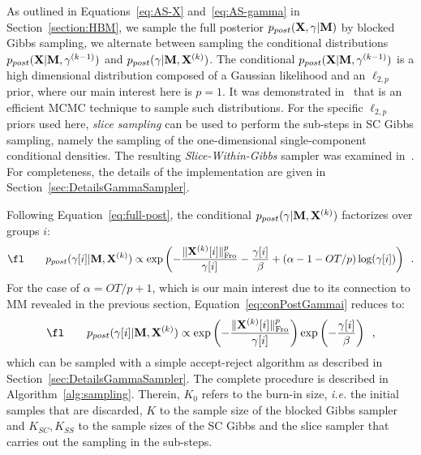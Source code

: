 As outlined in Equations~\eqref{eq:AS-X} and~\eqref{eq:AS-gamma} in Section~\ref{section:HBM}, we sample the full posterior $p_{post}(\mathbf{X},\gamma|\mathbf{M})$ by blocked Gibbs sampling, \ie we alternate between sampling the conditional distributions $p_{post}(\mathbf{X}|\mathbf{M},\mathbf{\gamma}^{(k-1)})$ and $p_{post}(\mathbf{\gamma}|\mathbf{M},\mathbf{X}^{(k)})$. The conditional $p_{post}(\mathbf{X}|\mathbf{M},\mathbf{\gamma}^{(k-1)})$ is a high dimensional distribution composed of a Gaussian likelihood and an $\ell_{2,p}$ prior, where our main interest here is $p = 1$. It was demonstrated in~\cite{Lu12} that  is an efficient MCMC technique to sample such distributions. For the specific $\ell_{2,p}$ priors used here, \emph{slice sampling} can be used to perform the sub-steps in SC Gibbs sampling, namely the sampling of the one-dimensional single-component conditional densities. The resulting \emph{Slice-Within-Gibbs} sampler was examined in~\cite{Lu16}. For completeness, the details of the implementation are given in Section~\ref{sec:DetailsGammaSampler}.

Following Equation~\eqref{eq:full-post}, the conditional $p_{post}(\mathbf{\gamma}|\mathbf{M},\mathbf{X}^{(k)})$ factorizes over groups $i$:
\begin{equation}
\fl \qquad p_{post}(\mathbf{\gamma}[i]|\bfM,\bfX^{(k)}) \propto \exp \left( -\frac{\fronorm{\bfX^{(k)}[i]}^p}{\mathbf{\gamma}[i]} - \frac{\mathbf{\gamma}[i]}{\beta} + (\alpha - 1 - O T/p) \log(\mathbf{\gamma}[i]) \right) \enspace. \label{eq:conPostGammai}
\end{equation}
For the case of $\alpha = O T/p + 1$, which is our main interest due to its connection to MM revealed in the previous section, Equation~\eqref{eq:conPostGammai} reduces to:
\begin{equation}
\fl \qquad p_{post}(\mathbf{\gamma}[i] |\bfM, \bfX^{(k)}) \propto \exp \left(- \frac{\fronorm{\bfX^{(k)}[i]}^p}{\mathbf{\gamma}[i]} \right) \exp \left(- \frac{\mathbf{\gamma}[i]}{\beta} \right) \enspace, \label{eq:conPostGammaiRed}
\end{equation}
which can be sampled with a simple accept-reject algorithm as described in Section~\ref{sec:DetailsGammaSampler}. The complete procedure is described in Algorithm~\ref{alg:sampling}. Therein, $K_0$ refers to the burn-in size, \textit{i.e.} the initial samples that are discarded, $K$ to the sample size of the blocked Gibbs sampler and $K_{SC}, K_{SS}$ to the sample sizes of the SC Gibbs and the slice sampler that carries out the sampling in the sub-steps.

